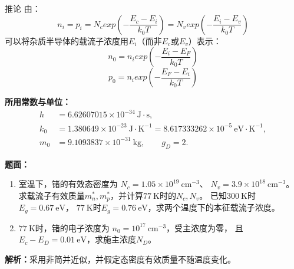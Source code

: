 \begin{theorem}{推论}
    由：
    \[n_i=p_i=N_cexp(-\frac{E_c-E_i}{k_0T})=N_vexp(-\frac{E_i-E_v}{k_0T})\]
    可以将杂质半导体的载流子浓度用$E_i$（而非$E_c$或$E_v$）表示：
    \[n_0=n_iexp(-\frac{E_i-E_F}{k_0T})\]
    \[p_0=n_iexp(-\frac{E_F-E_i}{k_0T})\]
\end{theorem}

\begin{problem}
    \textbf{所用常数与单位：}
    \[
    \begin{aligned}
        h&=6.62607015\times10^{-34}\ \mathrm{J\cdot s},\\
        k_0&=1.380649\times10^{-23}\ \mathrm{J\cdot K^{-1}}
        =8.617333262\times10^{-5}\ \mathrm{eV\cdot K^{-1}},\\
        m_0&=9.1093837\times10^{-31}\ \mathrm{kg},\qquad g_D=2.
    \end{aligned}
    \]

    \textbf{题面：}
    \begin{enumerate}
        \item 室温下，锗的有效态密度为
        $N_c=1.05\times10^{19}\ \mathrm{cm}^{-3}$、
        $N_v=3.9\times10^{18}\ \mathrm{cm}^{-3}$。
        求载流子有效质量$m_n^*,m_p^*$，并计算$77\ \mathrm{K}$时的$N_c,N_v$。
        已知$300\ \mathrm{K}$时$E_g=0.67\ \mathrm{eV}$，
        $77\ \mathrm{K}$时$E_g=0.76\ \mathrm{eV}$，求两个温度下的本征载流子浓度。
        \item $77\ \mathrm{K}$时，锗的电子浓度为
        $n_0=10^{17}\ \mathrm{cm}^{-3}$，受主浓度为零，
        且$E_c-E_D=0.01\ \mathrm{eV}$，求施主浓度$N_D$。
    \end{enumerate}

    \textbf{解析：}采用非简并近似，并假定态密度有效质量不随温度变化。


\end{problem}
